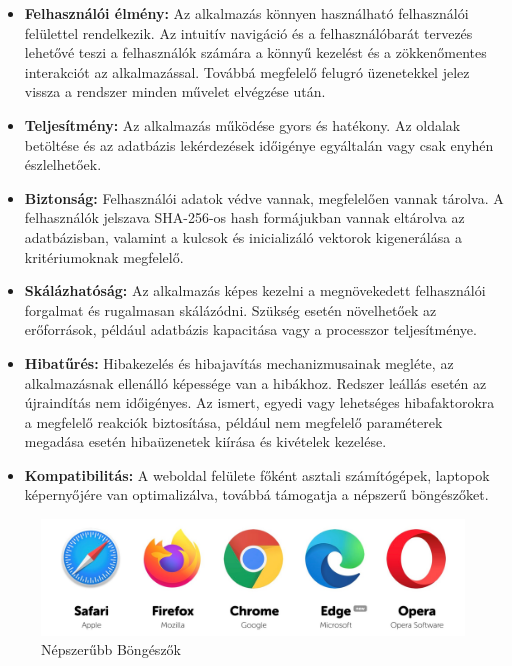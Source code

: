 \begin{itemize}
	\item\textbf{Felhasználói élmény:} Az alkalmazás könnyen használható felhasználói felülettel rendelkezik. Az intuitív navigáció és a felhasználóbarát tervezés lehetővé teszi a felhasználók számára a könnyű kezelést és a zökkenőmentes interakciót az alkalmazással. Továbbá megfelelő felugró üzenetekkel jelez vissza a rendszer minden művelet elvégzése után.

	\item\textbf{Teljesítmény:} Az alkalmazás működése gyors és hatékony. Az oldalak betöltése és az adatbázis lekérdezések időigénye egyáltalán vagy csak enyhén észlelhetőek. 

	\item\textbf{Biztonság:} Felhasználói adatok védve vannak, megfelelően vannak tárolva. A felhasználók jelszava SHA-256-os hash formájukban vannak eltárolva az adatbázisban, valamint a kulcsok és inicializáló vektorok kigenerálása a kritériumoknak megfelelő.

	\item\textbf{Skálázhatóság:} Az alkalmazás képes kezelni a megnövekedett felhasználói forgalmat és rugalmasan skálázódni. Szükség esetén növelhetőek az erőforrások, például adatbázis kapacitása vagy a processzor teljesítménye.

\pagebreak
	\item\textbf{Hibatűrés:} Hibakezelés és hibajavítás mechanizmusainak megléte, az alkalmazásnak ellenálló képessége van a hibákhoz. Redszer leállás esetén az újraindítás nem időigényes. Az ismert, egyedi vagy lehetséges hibafaktorokra a megfelelő reakciók biztosítása, például nem megfelelő paraméterek megadása esetén hibaüzenetek kiírása és kivételek kezelése.

	\item\textbf{Kompatibilitás:} A weboldal felülete főként asztali számítógépek, laptopok képernyőjére van optimalizálva, továbbá támogatja a népszerű böngészőket.
\end{itemize}

\begin{figure}[!h]
	\centering
	\includegraphics[scale=0.12]{images/webBrowsers}
	\caption{Népszerűbb Böngészők}
\end{figure}

